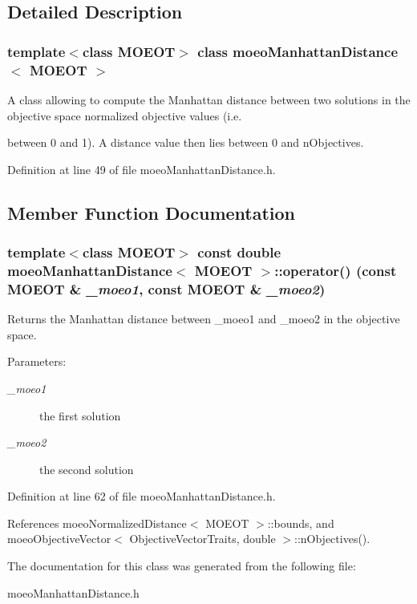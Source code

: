 \subsection{Detailed Description}
\subsubsection*{template$<$class MOEOT$>$ class moeo\-Manhattan\-Distance$<$ MOEOT $>$}

A class allowing to compute the Manhattan distance between two solutions in the objective space normalized objective values (i.e. 

between 0 and 1). A distance value then lies between 0 and n\-Objectives. 



Definition at line 49 of file moeo\-Manhattan\-Distance.h.

\subsection{Member Function Documentation}
\subsubsection{\setlength{\rightskip}{0pt plus 5cm}template$<$class MOEOT$>$ const double \bf{moeo\-Manhattan\-Distance}$<$ MOEOT $>$::operator() (const MOEOT \& {\em \_\-moeo1}, const MOEOT \& {\em \_\-moeo2})\hspace{0.3cm}{\tt  [inline]}}\label{classmoeoManhattanDistance_dcabb2bddb46439a47cd1af5dd124f92}


Returns the Manhattan distance between \_\-moeo1 and \_\-moeo2 in the objective space. 

\begin{Desc}
\item[Parameters:]
\begin{description}
\item[{\em \_\-moeo1}]the first solution \item[{\em \_\-moeo2}]the second solution \end{description}
\end{Desc}


Definition at line 62 of file moeo\-Manhattan\-Distance.h.

References moeo\-Normalized\-Distance$<$ MOEOT $>$::bounds, and moeo\-Objective\-Vector$<$ Objective\-Vector\-Traits, double $>$::n\-Objectives().

The documentation for this class was generated from the following file:\begin{CompactItemize}
\item 
moeo\-Manhattan\-Distance.h\end{CompactItemize}
